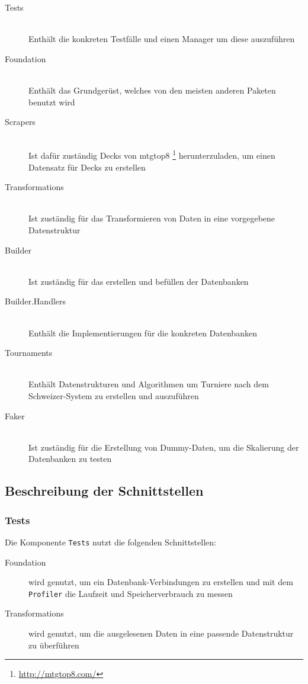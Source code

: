 \begin{description}
    \item[Tests]  \hfill \\
    Enthält die konkreten Testfälle und einen Manager um diese auszuführen
    
    \item[Foundation]  \hfill \\
    Enthält das Grundgerüst, welches von den meisten anderen Paketen benutzt wird
     
    \item[Scrapers]  \hfill \\
    Ist dafür zuständig Decks von mtgtop8 \footnote{\url{http://mtgtop8.com/}} herunterzuladen, um einen Datensatz für Decks zu erstellen
    
    \item[Transformations]  \hfill \\
    Ist zuständig für das Transformieren von Daten in eine vorgegebene Datenstruktur
    
    \item[Builder] \hfill \\
    Ist zuständig für das erstellen und befüllen der Datenbanken
    
    \item[Builder.Handlers]  \hfill \\
    Enthält die Implementierungen für die konkreten Datenbanken
    
    \item[Tournaments]  \hfill \\
    Enthält Datenstrukturen und Algorithmen um Turniere nach dem Schweizer-System zu erstellen und auszuführen
    
    \item[Faker]  \hfill \\
    Ist zuständig für die Erstellung von Dummy-Daten, um die Skalierung der Datenbanken zu testen
\end{description}

\subsection{Beschreibung der Schnittstellen}
\subsubsection*{Tests}
Die Komponente \verb|Tests| nutzt die folgenden Schnittstellen:
\begin{description}
    \item[Foundation] wird genutzt, um ein Datenbank-Verbindungen zu erstellen und mit dem \verb|Profiler| die Laufzeit und Speicherverbrauch zu messen
    \item[Transformations] wird genutzt, um die ausgelesenen Daten in eine passende Datenstruktur zu überführen
\end{description}

